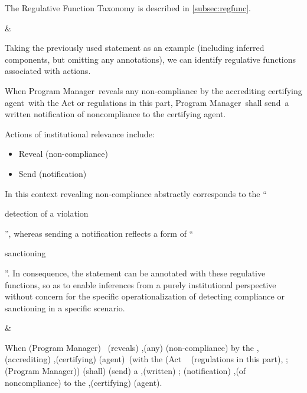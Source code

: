 \begin{landscape}
\begin{longtable}{\tabledims}
The Regulative Function Taxonomy is described in \cref{subsec:regfunc}.

&

Taking the previously used statement as an example (including inferred components, but omitting any annotations), we can identify regulative functions associated with actions.

\sp

\begin{exi}
\lb When \lsi Program Manager\rsi~reveals any non-compliance \lsi by the accrediting certifying agent\rsi~with the Act or regulations in this part\rb , \lsi Program Manager\rsi~shall \lsi send\rsi~a written notification of noncompliance to the certifying agent.\end{exi}

\sp

Actions of institutional relevance include:

\begin{itemize}
    \item Reveal (non-compliance)
    \item Send (notification)
\end{itemize}

In this context revealing non-compliance abstractly corresponds to the ``\begin{exi}detection of a violation\end{exi}'', whereas sending a notification reflects a form of ``\begin{exi}sanctioning\end{exi}''. In consequence, the statement can be annotated with these regulative functions, so as to enable inferences from a purely institutional perspective without concern for the specific operationalization of detecting compliance or sanctioning in a specific scenario.

&

\vspace{2.55cm}

\begin{exi}\Cac{}\lb When \A{}(\lsi Program Manager\rsi)~ \I{}(reveals) \Bdir{},\prop{}(any) \Bdir{}(non-compliance) \lsi by the  \Bind{},(accrediting) \Bind{},(certifying) \Bind{}(agent)\rsi~\Cex{}(with the (Act \OR{}~ (regulations in this part)\rb, \A{}; (\lsi Program Manager)\rsi) \D{}(shall) \I{}(\lsi send\rsi) a \Bdir{},(written) \Bdir{}; (notification) \Bdir{},(of noncompliance) to the \Bind{},(certifying) \Bind{}(agent).\end{exi}


\end{longtable}
\end{landscape}

